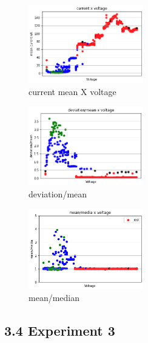 \begin{multicols}{3}

    \begin{figure}[H]
        \center
        \includegraphics[width=5cm]{images/images_folder_3/data3_sjaaksgraph1.png}
        \caption{current mean X voltage}
    \end{figure}

    \begin{figure}[H]
        \center
        \includegraphics[width=5cm]{images/images_folder_3/data3_sjaaksgraph2.png}
        \caption{deviation/mean}
    \end{figure}

    \begin{figure}[H]
        \center
        \includegraphics[width=5cm]{images/images_folder_3/data3_sjaaksgraph3.png}
        \caption{mean/median}
    \end{figure}

\end{multicols}


\subsection*{3.4 Experiment 3}

